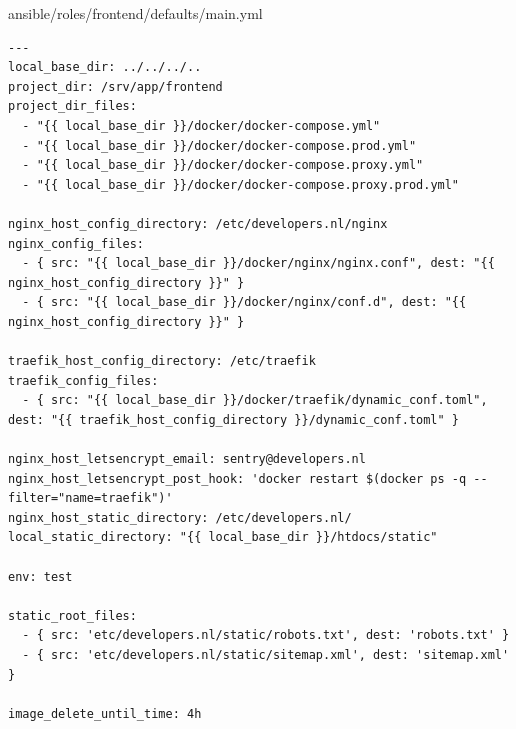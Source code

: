 ansible/roles/frontend/defaults/main.yml
\begin{verbatim}
---
local_base_dir: ../../../..
project_dir: /srv/app/frontend
project_dir_files:
  - "{{ local_base_dir }}/docker/docker-compose.yml"
  - "{{ local_base_dir }}/docker/docker-compose.prod.yml"
  - "{{ local_base_dir }}/docker/docker-compose.proxy.yml"
  - "{{ local_base_dir }}/docker/docker-compose.proxy.prod.yml"

nginx_host_config_directory: /etc/developers.nl/nginx
nginx_config_files:
  - { src: "{{ local_base_dir }}/docker/nginx/nginx.conf", dest: "{{ nginx_host_config_directory }}" }
  - { src: "{{ local_base_dir }}/docker/nginx/conf.d", dest: "{{ nginx_host_config_directory }}" }

traefik_host_config_directory: /etc/traefik
traefik_config_files:
  - { src: "{{ local_base_dir }}/docker/traefik/dynamic_conf.toml", dest: "{{ traefik_host_config_directory }}/dynamic_conf.toml" }

nginx_host_letsencrypt_email: sentry@developers.nl
nginx_host_letsencrypt_post_hook: 'docker restart $(docker ps -q --filter="name=traefik")'
nginx_host_static_directory: /etc/developers.nl/
local_static_directory: "{{ local_base_dir }}/htdocs/static"

env: test

static_root_files:
  - { src: 'etc/developers.nl/static/robots.txt', dest: 'robots.txt' }
  - { src: 'etc/developers.nl/static/sitemap.xml', dest: 'sitemap.xml' }

image_delete_until_time: 4h
\end{verbatim}

